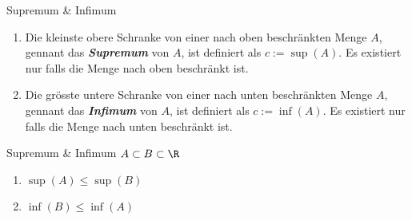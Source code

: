 \setcounter{all}{15}
\begin{theorem}[]{Supremum \& Infimum}
    \begin{enumerate}[label=\textit{(\roman*)}]
        \item {}
              {Die kleinste obere Schranke von einer nach oben beschränkten Menge $A$, gennant das \textbf{\textit{Supremum}} von $A$, ist definiert als}
              $c := \sup(A)$.
              {Es existiert nur falls die Menge nach oben beschränkt ist.}
        \item {}
              {Die grösste untere Schranke von einer nach unten beschränkten Menge $A$, gennant das \textbf{\textit{Infimum}} von $A$, ist definiert als}
              $c := \inf(A)$.
              {Es existiert nur falls die Menge nach unten beschränkt ist.}
    \end{enumerate}
\end{theorem}

\begin{corollary}[]{Supremum \& Infimum}
    \trLet $A \subset B \subset \R$
    \vspace{-0.9pc}
    \begin{multicols}{2}
        \begin{enumerate}[label=\textit{(\arabic*)}]
            \item {} $\sup(A) \leq \sup(B)$
            \item {} $\inf(B) \leq \inf(A)$
        \end{enumerate}
    \end{multicols}
\end{corollary}



\setcounter{subsection}{2}
\subsection{}

